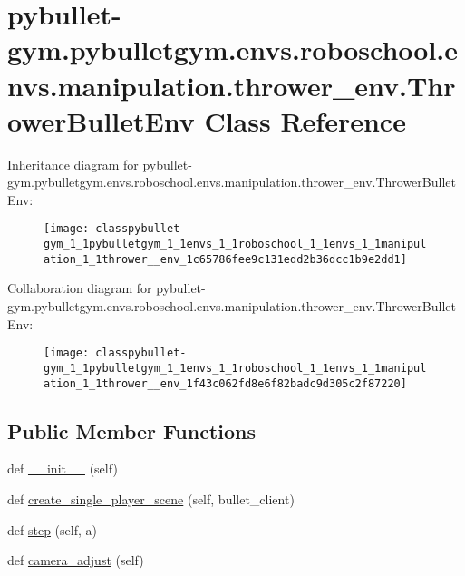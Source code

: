 \hypertarget{classpybullet-gym_1_1pybulletgym_1_1envs_1_1roboschool_1_1envs_1_1manipulation_1_1thrower__env_1_1_thrower_bullet_env}{}\section{pybullet-\/gym.pybulletgym.\+envs.\+roboschool.\+envs.\+manipulation.\+thrower\+\_\+env.\+Thrower\+Bullet\+Env Class Reference}
\label{classpybullet-gym_1_1pybulletgym_1_1envs_1_1roboschool_1_1envs_1_1manipulation_1_1thrower__env_1_1_thrower_bullet_env}


Inheritance diagram for pybullet-\/gym.pybulletgym.\+envs.\+roboschool.\+envs.\+manipulation.\+thrower\+\_\+env.\+Thrower\+Bullet\+Env\+:
\nopagebreak
\begin{figure}[H]
\begin{center}
\leavevmode
\texttt{[image: classpybullet-gym\_1\_1pybulletgym\_1\_1envs\_1\_1roboschool\_1\_1envs\_1\_1manipulation\_1\_1thrower\_\_env\_1c65786fee9c131edd2b36dcc1b9e2dd1]}
\end{center}
\end{figure}


Collaboration diagram for pybullet-\/gym.pybulletgym.\+envs.\+roboschool.\+envs.\+manipulation.\+thrower\+\_\+env.\+Thrower\+Bullet\+Env\+:
\nopagebreak
\begin{figure}[H]
\begin{center}
\leavevmode
\texttt{[image: classpybullet-gym\_1\_1pybulletgym\_1\_1envs\_1\_1roboschool\_1\_1envs\_1\_1manipulation\_1\_1thrower\_\_env\_1f43c062fd8e6f82badc9d305c2f87220]}
\end{center}
\end{figure}
\subsection*{Public Member Functions}
\begin{DoxyCompactItemize}
\item 
def \hyperlink{classpybullet-gym_1_1pybulletgym_1_1envs_1_1roboschool_1_1envs_1_1manipulation_1_1thrower__env_1_1_thrower_bullet_env_ad5c1626d99ed89a0db346494b967d653}{\+\_\+\+\_\+init\+\_\+\+\_\+} (self)
\item 
def \hyperlink{classpybullet-gym_1_1pybulletgym_1_1envs_1_1roboschool_1_1envs_1_1manipulation_1_1thrower__env_1_1_thrower_bullet_env_a81f26a40dd26335a5b904df14f29dd4c}{create\+\_\+single\+\_\+player\+\_\+scene} (self, bullet\+\_\+client)
\item 
def \hyperlink{classpybullet-gym_1_1pybulletgym_1_1envs_1_1roboschool_1_1envs_1_1manipulation_1_1thrower__env_1_1_thrower_bullet_env_aaabf31eaa0ec013243136e10a71fb960}{step} (self, a)
\item 
def \hyperlink{classpybullet-gym_1_1pybulletgym_1_1envs_1_1roboschool_1_1envs_1_1manipulation_1_1thrower__env_1_1_thrower_bullet_env_ac5bfeec410fd5c018fecf76c0b43f013}{camera\+\_\+adjust} (self)
\end{DoxyCompactItemize}
